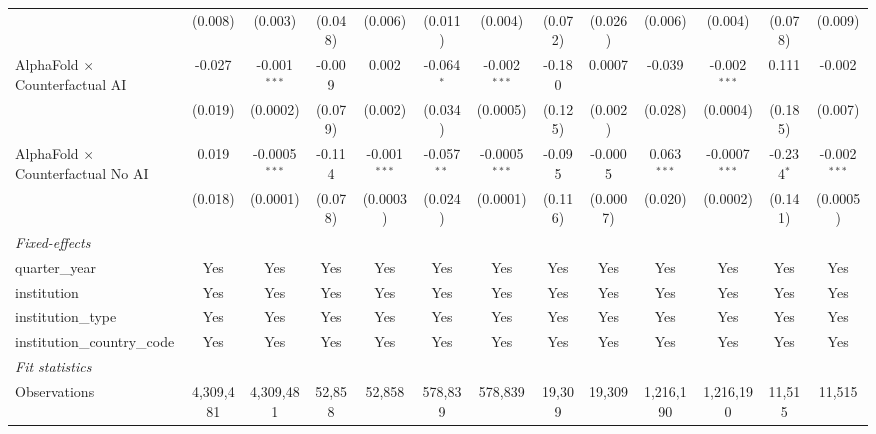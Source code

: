 \begin{tabular}{lcccccccccccc}
                                            & (0.008)       & (0.003)         & (0.048)       & (0.006)        & (0.011)       & (0.004)         & (0.072) & (0.026)  & (0.006)       & (0.004)         & (0.078)       & (0.009)\\   
   AlphaFold $\times$ Counterfactual AI     & -0.027        & -0.001$^{***}$  & -0.009        & 0.002          & -0.064$^{*}$  & -0.002$^{***}$  & -0.180  & 0.0007   & -0.039        & -0.002$^{***}$  & 0.111         & -0.002\\   
                                            & (0.019)       & (0.0002)        & (0.079)       & (0.002)        & (0.034)       & (0.0005)        & (0.125) & (0.002)  & (0.028)       & (0.0004)        & (0.185)       & (0.007)\\   
   AlphaFold $\times$ Counterfactual No AI  & 0.019         & -0.0005$^{***}$ & -0.114        & -0.001$^{***}$ & -0.057$^{**}$ & -0.0005$^{***}$ & -0.095  & -0.0005  & 0.063$^{***}$ & -0.0007$^{***}$ & -0.234$^{*}$  & -0.002$^{***}$\\   
                                            & (0.018)       & (0.0001)        & (0.078)       & (0.0003)       & (0.024)       & (0.0001)        & (0.116) & (0.0007) & (0.020)       & (0.0002)        & (0.141)       & (0.0005)\\   
   \midrule
   \emph{Fixed-effects}\\
   quarter\_year                            & Yes           & Yes             & Yes           & Yes            & Yes           & Yes             & Yes     & Yes      & Yes           & Yes             & Yes           & Yes\\  
   institution                              & Yes           & Yes             & Yes           & Yes            & Yes           & Yes             & Yes     & Yes      & Yes           & Yes             & Yes           & Yes\\  
   institution\_type                        & Yes           & Yes             & Yes           & Yes            & Yes           & Yes             & Yes     & Yes      & Yes           & Yes             & Yes           & Yes\\  
   institution\_country\_code               & Yes           & Yes             & Yes           & Yes            & Yes           & Yes             & Yes     & Yes      & Yes           & Yes             & Yes           & Yes\\  
   \midrule
   \emph{Fit statistics}\\
   Observations                             & 4,309,481     & 4,309,481       & 52,858        & 52,858         & 578,839       & 578,839         & 19,309  & 19,309   & 1,216,190     & 1,216,190       & 11,515        & 11,515\\  

\end{tabular}
